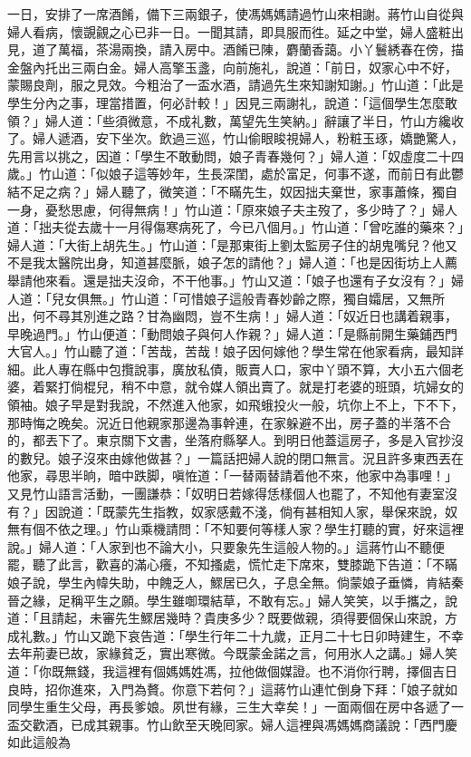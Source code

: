一日，安排了一席酒餚，備下三兩銀子，使馮媽媽請過竹山來相謝。蔣竹山自從與婦人看病，懷覬覦之心已非一日。一聞其請，即具服而徃。延之中堂，婦人盛粧出見，道了萬福，茶湯兩換，請入房中。酒餚已陳，麝蘭香藹。小丫鬟綉春在傍，描金盤內托出三兩白金。婦人高擎玉盞，向前施礼，說道：「前日，奴家心中不好，蒙賜良劑，服之見效。今粗治了一盃水酒，請過先生來知謝知謝。」竹山道：「此是學生分內之事，理當措置，何必計較！」因見三兩謝礼，說道：「這個學生怎麼敢領？」婦人道：「些須微意，不成礼數，萬望先生笑納。」辭讓了半日，竹山方纔收了。婦人遞酒，安下坐次。飲過三巡，竹山偷眼睃視婦人，粉粧玉琢，嬌艷驚人，先用言以挑之，因道：「學生不敢動問，娘子青春幾何？」婦人道：「奴虛度二十四歲。」竹山道：「似娘子這等妙年，生長深閨，處於富足，何事不遂，而前日有此鬱結不足之病？」{}婦人聽了，微笑道：「不瞞先生，奴因拙夫棄世，家事蕭條，獨自一身，{}憂愁思慮，何得無病！」竹山道：「原來娘子夫主歿了，多少時了？」婦人道：「拙夫從去歲十一月得傷寒病死了，今已八個月。」竹山道：「曾吃誰的藥來？」{}婦人道：「大街上胡先生。」竹山道：「是那東街上劉太監房子住的胡鬼嘴兒？他又不是我太醫院出身，知道甚麼脈，娘子怎的請他？」婦人道：「也是因街坊上人薦舉請他來看。還是拙夫沒命，不干他事。」竹山又道：「娘子也還有子女沒有？」婦人道：「兒女俱無。」竹山道：「可惜娘子這般青春妙齡之際，獨自孀居，又無所出，何不尋其別進之路？甘為幽悶，豈不生病！」{}婦人道：「奴近日也講着親事，早晚過門。」竹山便道：「動問娘子與何人作親？」婦人道：「是縣前開生藥鋪西門大官人。」竹山聽了道：「苦哉，苦哉！娘子因何嫁他？學生常在他家看病，最知詳細。此人專在縣中包攬說事，廣放私債，販賣人口，家中丫頭不算，大小五六個老婆，着緊打倘棍兒，稍不中意，就令媒人領出賣了。就是打老婆的班頭，坑婦女的領袖。娘子早是對我說，不然進入他家，如飛蛾投火一般，坑你上不上，下不下，那時悔之晚矣。況近日他親家那邊為事幹連，在家躲避不出，房子蓋的半落不合的，都丟下了。東京關下文書，坐落府縣拏人。到明日他蓋這房子，多是入官抄沒的數兒。娘子沒來由嫁他做甚？」一篇話把婦人說的閉口無言。況且許多東西丟在他家，尋思半晌，暗中跌脚，{}嗔恠道：「一替兩替請着他不來，他家中為事哩！」又見竹山語言活動，一團謙恭：「奴明日若嫁得恁樣個人也罷了，{}不知他有妻室沒有？」因說道：「既蒙先生指教，奴家感戴不淺，倘有甚相知人家，舉保來說，奴無有個不依之理。」竹山乘機請問：「不知要何等樣人家？學生打聽的實，好來這裡說。」婦人道：「人家到也不論大小，只要象先生這般人物的。」這蔣竹山不聽便罷，聽了此言，歡喜的滿心癢，不知搔處，慌忙走下席來，雙膝跪下告道：「不瞞娘子說，學生內幃失助，中餽乏人，鰥居已久，子息全無。倘蒙娘子垂憐，肯結秦晉之緣，足稱平生之願。學生雖啣環結草，不敢有忘。」{}婦人笑笑，以手攜之，說道：「且請起，未審先生鰥居幾時？貴庚多少？既要做親，須得要個保山來說，方成礼數。」竹山又跪下哀告道：「學生行年二十九歲，正月二十七日卯時建生，不幸去年荊妻已故，家緣貧乏，實出寒微。今既蒙金諾之言，何用氷人之講。」婦人笑道：「你既無錢，我這裡有個媽媽姓馮，拉他做個媒證。也不消你行聘，擇個吉日良時，招你進來，入門為贅。你意下若何？」這蔣竹山連忙倒身下拜：「娘子就如同學生重生父母，再長爹娘。夙世有緣，三生大幸矣！」一面兩個在房中各遞了一盃交歡酒，已成其親事。竹山飲至天晚囘家。婦人這裡與馮媽媽商議說：「西門慶如此這般為